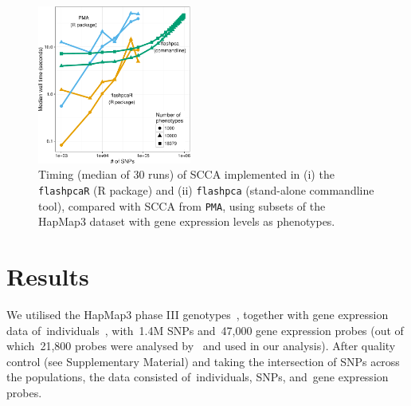\documentclass{bioinfo}
\begin{document}
\begin{methods}

\end{methods}

\begin{figure}[!tpb]
\centerline{\includegraphics[width=0.45\textwidth]{scca_timing-crop.pdf}}
\caption{
Timing (median of 30 runs) of SCCA implemented in (i) the \texttt{flashpcaR}
(\textsf{R} package) and (ii) \texttt{flashpca} (stand-alone commandline tool),
compared with SCCA from \texttt{PMA}, using subsets of the HapMap3 dataset with gene
expression levels as phenotypes.
}
\label{fig:01}
\end{figure}

\section{Results}

We utilised the HapMap3 phase III genotypes~\citep{hapmap2010}, together with
gene expression data of~\nindiv individuals~\citep{Stranger2012}, with~1.4M
SNPs and~47,000 gene expression probes (out of which~21,800 probes were
analysed by~\citet{Stranger2012} and used in our analysis). After quality
control (see Supplementary Material) and taking the intersection of SNPs
across the populations, the data consisted of~\nindiv individuals, \nsnps
SNPs, and~\ngenes gene expression probes.
\end{document}
